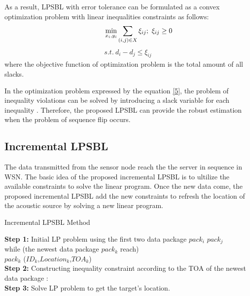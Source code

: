 As a result, LPSBL with error tolerance can be formulated as a convex optimization problem with linear inequalities constraints as follows:
 \begin{equation} \label{5}
\quad \quad \quad \mathop {\min }\limits_{{x_i},{y_i}} \sum\limits_{(i,j) \in X} {{\xi _{ij}}};\  \xi _{ij} \ge 0\\
  \end{equation}
  \begin{align*}
 s.t.\   d_i - d_j  \le  \xi _{ij} \
\end{align*}
where the objective function of optimization problem is the total amount of all slacks. 

In the optimization problem expressed by the equation \eqref{5}, the problem of inequality violations can be solved by introducing a slack variable for each inequality \cite{Boyd2004}.
Therefore, the proposed LPSBL can provide the robust estimation when the problem of sequence flip occurs.








\subsection{Incremental LPSBL }

The data transmitted from the sensor node reach the the server in sequence in WSN.
The basic idea of the proposed incremental LPSBL is to ultilize the available constraints to solve the linear program.
Once the new data come, the proposed incremental LPSBL add the new constraints to refresh the location of the acoustic source by solving a
new linear program.
\begin{algorithm}
\caption{Incremental LPSBL Method}
 
 \textbf{Step 1:}  Initial LP problem using the first two data package $pack_i$ $pack_j$ \\
          while (the newest data package $pack_k$ reach)\\		 
		   $pack_k$ ($ID_k$,$Location_k$,$TOA_k$)\\
\textbf{Step 2:}  Constructing inequality constraint according to the TOA of the newest data package : \\ 

\textbf{Step 3:} Solve LP problem to get the target's location.\\
       
 
 \end{algorithm}


